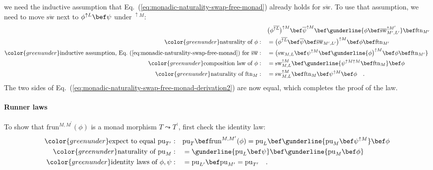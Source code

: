 we need the inductive assumption that Eq.~(\ref{eq:monadic-naturality-swap-free-monad})
already holds for $\overline{\text{sw}}$. To use that assumption,
we need to move $\overline{\text{sw}}$ next to $\phi^{\uparrow L}\bef\psi$
under $^{\uparrow M}$:
\begin{align*}
 & \big(\phi^{\overline{\uparrow L}}\big)^{\uparrow M}\bef\overline{\psi}^{\uparrow M}\bef\gunderline{\phi\bef\overline{\text{sw}}_{M^{\prime},L^{\prime}}^{\uparrow M^{\prime}}}\bef\text{ftn}_{M^{\prime}}\\
{\color{greenunder}\text{naturality of }\phi:}\quad & =\big(\phi^{\overline{\uparrow L}}\bef\overline{\psi}\bef\text{\ensuremath{\overline{\text{sw}}_{M^{\prime},L^{\prime}}}}\big)^{\uparrow M}\bef\phi\bef\text{ftn}_{M^{\prime}}\\
{\color{greenunder}\text{inductive assumption, Eq.~(\ref{eq:monadic-naturality-swap-free-monad}) for }\overline{\text{sw}}:}\quad & =\big(\text{sw}_{M,L}\bef\psi^{\uparrow M}\bef\gunderline{\phi\big)^{\uparrow M}\bef\phi\bef\text{ftn}_{M^{\prime}}}\\
{\color{greenunder}\text{composition law of }\phi:}\quad & =\text{sw}_{M,L}^{\uparrow M}\bef\gunderline{\psi^{\uparrow M\uparrow M}\bef\text{ftn}_{M}}\bef\phi\\
{\color{greenunder}\text{naturality of }\text{ftn}_{M}:}\quad & =\text{sw}_{M,L}^{\uparrow M}\bef\text{ftn}_{M}\bef\psi^{\uparrow M}\bef\phi\quad.
\end{align*}
The two sides of Eq.~(\ref{eq:monadic-naturality-swap-free-monad-derivation2})
are now equal, which completes the proof of the law.

\paragraph{Runner laws}

To show that $\text{frun}^{M,M^{\prime}}(\phi)$ is a monad morphism
$T\leadsto T^{\prime}$, first check the identity law:
\begin{align*}
{\color{greenunder}\text{expect to equal }\text{pu}_{T^{\prime}}:}\quad & \text{pu}_{T}\bef\text{frun}^{M,M^{\prime}}(\phi)=\text{pu}_{L}\bef\gunderline{\text{pu}_{M}\bef\psi^{\uparrow M}}\bef\phi\\
{\color{greenunder}\text{naturality of }\text{pu}_{M}:}\quad & =\gunderline{\text{pu}_{L}\bef\psi}\bef\gunderline{\text{pu}_{M}\bef\phi}\\
{\color{greenunder}\text{identity laws of }\phi,\psi:}\quad & =\text{pu}_{L^{\prime}}\bef\text{pu}_{M^{\prime}}=\text{pu}_{T^{\prime}}\quad.
\end{align*}

